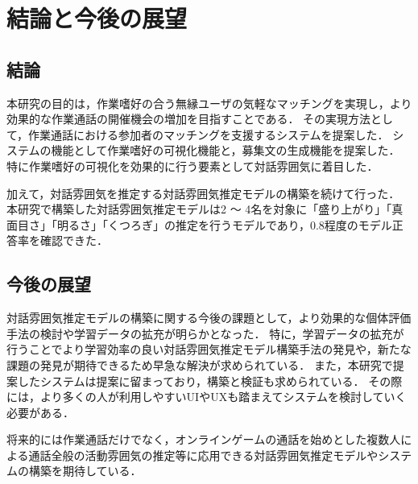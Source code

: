 \chapter{結論と今後の展望\label{sec:conclusion}}
\thispagestyle{plain}

\section{結論}

本研究の目的は，作業嗜好の合う無縁ユーザの気軽なマッチングを実現し，より効果的な作業通話の開催機会の増加を目指すことである．
その実現方法として，作業通話における参加者のマッチングを支援するシステムを提案した．
システムの機能として作業嗜好の可視化機能と，募集文の生成機能を提案した．
特に作業嗜好の可視化を効果的に行う要素として対話雰囲気に着目した．

加えて，対話雰囲気を推定する対話雰囲気推定モデルの構築を続けて行った．
本研究で構築した対話雰囲気推定モデルは2 〜 4名を対象に「盛り上がり」「真面目さ」「明るさ」「くつろぎ」の推定を行うモデルであり，0.8程度のモデル正答率を確認できた．

\section{今後の展望}

対話雰囲気推定モデルの構築に関する今後の課題として，より効果的な個体評価手法の検討や学習データの拡充が明らかとなった．
特に，学習データの拡充が行うことでより学習効率の良い対話雰囲気推定モデル構築手法の発見や，新たな課題の発見が期待できるため早急な解決が求められている．
また，本研究で提案したシステムは提案に留まっており，構築と検証も求められている．
その際には，より多くの人が利用しやすいUIやUXも踏まえてシステムを検討していく必要がある．

将来的には作業通話だけでなく，オンラインゲームの通話を始めとした複数人による通話全般の活動雰囲気の推定等に応用できる対話雰囲気推定モデルやシステムの構築を期待している．

